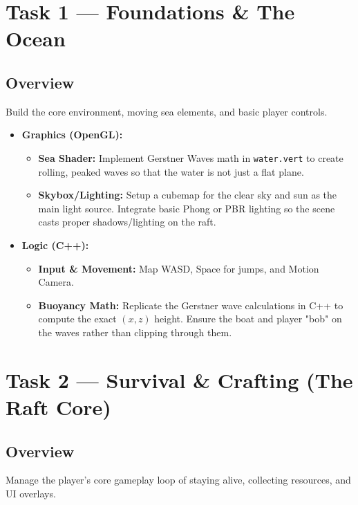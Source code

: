 \documentclass[12pt,a4paper]{article}
\begin{document}
\section{Task 1 — Foundations \& The Ocean}

\subsection{Overview}
Build the core environment, moving sea elements, and basic player controls.

\begin{itemize}[leftmargin=*]
    \item \textbf{Graphics (OpenGL):} 
    \begin{itemize}
        \item \textbf{Sea Shader:} Implement Gerstner Waves math in \texttt{water.vert} to create rolling, peaked waves so that the water is not just a flat plane.
        \item \textbf{Skybox/Lighting:} Setup a cubemap for the clear sky and sun as the main light source. Integrate basic Phong or PBR lighting so the scene casts proper shadows/lighting on the raft.
    \end{itemize}
    \item \textbf{Logic (C++):}
    \begin{itemize}
        \item \textbf{Input \& Movement:} Map WASD, Space for jumps, and Motion Camera. 
        \item \textbf{Buoyancy Math:} Replicate the Gerstner wave calculations in C++ to compute the exact $(x,z)$ height. Ensure the boat and player "bob" on the waves rather than clipping through them.
    \end{itemize}
\end{itemize}

\section{Task 2 — Survival \& Crafting (The Raft Core)}

\subsection{Overview}
Manage the player's core gameplay loop of staying alive, collecting resources, and UI overlays.
\end{document}
